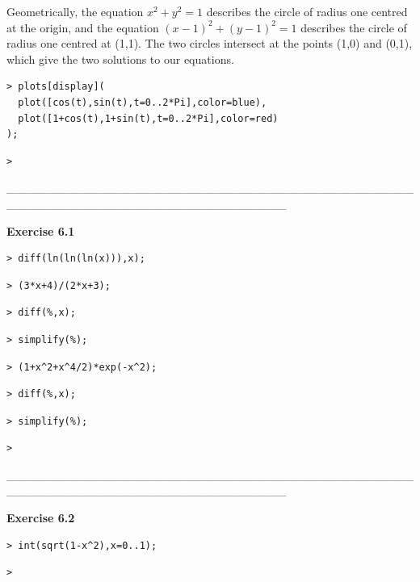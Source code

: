 \documentclass{article}
\begin{document}
\begin{Maple Normal}

\end{Maple Normal}
\begin{Maple Normal}
Geometrically, the equation 
$ x^{2}+y^{2}=1 $ describes the circle of radius one centred at the origin, and the equation 
$ (x -1)^{2}+(y -1)^{2}=1 $ describes the circle of radius one centred at (1,1).  The two circles intersect at the points (1,0) and (0,1), which give the two solutions to our equations.
\end{Maple Normal}
\begin{Maple Normal}

\end{Maple Normal}
\begin{lstlisting}
> plots[display](
  plot([cos(t),sin(t),t=0..2*Pi],color=blue),
  plot([1+cos(t),1+sin(t),t=0..2*Pi],color=red)
);
\end{lstlisting}
\begin{lstlisting}
> 
\end{lstlisting}
\begin{Maple Normal}
\_\_\_\_\_\_\_\_\_\_\_\_\_\_\_\_\_\_\_\_\_\_\_\_\_\_\_\_\_\_\_\_\_\_\_\_\_\_\_\_\_\_\_\_\_\_\_\_\_\_\_\_\_\_\_\_\_\_\_\_\_\_\_\_\_\_\_\_\_\_\_\_\_\_\_\_\_\_\_\_\_
\end{Maple Normal}
\begin{Maple Heading 2}
\textbf{Exercise 6.1}
\end{Maple Heading 2}
\begin{lstlisting}
> diff(ln(ln(ln(x))),x);
\end{lstlisting}
\begin{lstlisting}
> (3*x+4)/(2*x+3);
\end{lstlisting}
\begin{lstlisting}
> diff(%,x);
\end{lstlisting}
\begin{lstlisting}
> simplify(%);
\end{lstlisting}
\begin{lstlisting}
> (1+x^2+x^4/2)*exp(-x^2);
\end{lstlisting}
\begin{lstlisting}
> diff(%,x);
\end{lstlisting}
\begin{lstlisting}
> simplify(%);
\end{lstlisting}
\begin{lstlisting}
> 
\end{lstlisting}
\begin{Maple Normal}
\_\_\_\_\_\_\_\_\_\_\_\_\_\_\_\_\_\_\_\_\_\_\_\_\_\_\_\_\_\_\_\_\_\_\_\_\_\_\_\_\_\_\_\_\_\_\_\_\_\_\_\_\_\_\_\_\_\_\_\_\_\_\_\_\_\_\_\_\_\_\_\_\_\_\_\_\_\_\_\_\_
\end{Maple Normal}
\begin{Maple Heading 2}
\textbf{Exercise 6.2}
\end{Maple Heading 2}
\begin{lstlisting}
> int(sqrt(1-x^2),x=0..1);
\end{lstlisting}
\begin{lstlisting}
> 
\end{lstlisting}
\end{document}
